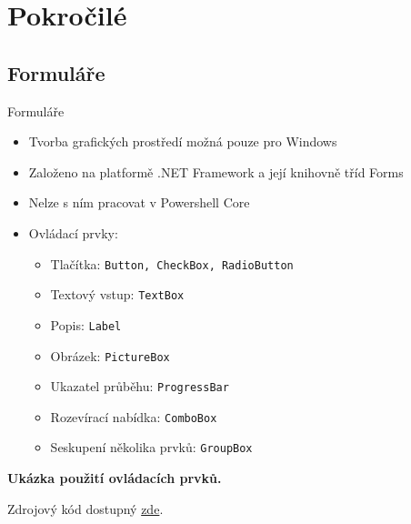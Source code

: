 \documentclass[main.tex]{subfiles}
\begin{document}
\section{Pokročilé}

\subsection{Formuláře}
\begin{frame}{Formuláře}
\begin{itemize}
  \item Tvorba grafických prostředí možná pouze pro Windows
  \item Založeno na platformě .NET Framework a její knihovně tříd Forms
  \item Nelze s ním pracovat v Powershell Core
  \item Ovládací prvky:
    \begin{itemize}
      \item Tlačítka: \texttt{Button, CheckBox, RadioButton}
      \item Textový vstup: \texttt{TextBox}
      \item Popis: \texttt{Label}
      \item Obrázek: \texttt{PictureBox}
      \item Ukazatel průběhu: \texttt{ProgressBar}
      \item Rozevírací nabídka: \texttt{ComboBox}
      \item Seskupení několika prvků: \texttt{GroupBox}
    \end{itemize}
\end{itemize}
\begin{center}
  \textbf{Ukázka použití ovládacích prvků.}

  Zdrojový kód dostupný \href{https://gist.github.com/kalivtrope/1c8edaace6c65225010a6791fcef3fa6}{zde}.\\[2mm]


\end{center}
\end{frame}
\end{document}
